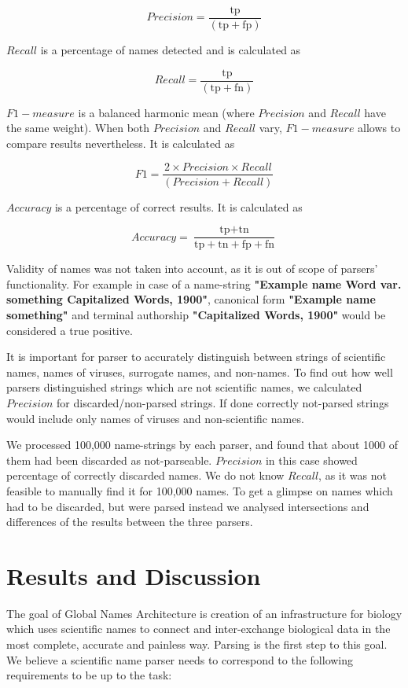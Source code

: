 \documentclass{bmcart}
\begin{document}
\[Precision = \dfrac{\text{tp}}{(\text{tp} + \text{fp})}\]

$Recall$ is a percentage of names detected and is calculated as

\[Recall = \dfrac{\text{tp}}{(\text{tp} + \text{fn})}\]

$F1-measure$ is a balanced harmonic mean (where $Precision$ and $Recall$ have
the same weight). When both $Precision$ and $Recall$ vary, $F1-measure$ allows
to compare results nevertheless. It is calculated as

\[F1 = \dfrac{2 \times Precision \times Recall}{(Precision + Recall)}\]

$Accuracy$ is a percentage of correct results. It is calculated as

\[Accuracy = \dfrac{\text{tp} + \text{tn}}
  {\text{tp} + \text{tn} + \text{fp} + \text{fn}}\]

Validity of names was not taken into account, as it is out of scope of
parsers' functionality. For example in case of a name-string \textbf{"Example
name Word var.  something Capitalized Words, 1900"}, canonical form
\textbf{"Example name something"} and terminal authorship \textbf{"Capitalized
Words, 1900"} would be considered a true positive.

It is important for parser to accurately distinguish between strings of
scientific names, names of viruses, surrogate names, and non-names. To find
out how well parsers distinguished strings which are not scientific names, we
calculated $Precision$ for discarded/non-parsed strings. If done correctly
not-parsed strings would include only names of viruses and non-scientific
names.

We processed 100,000 name-strings by each parser, and found that about 1000 of
them had been discarded as not-parseable. $Precision$ in this case showed
percentage of correctly discarded names.  We do not know $Recall$, as it was
not feasible to manually find it for 100,000 names. To get a glimpse on names
which had to be discarded, but were parsed instead we analysed intersections
and differences of the results between the three parsers.

\section*{Results and Discussion}

The goal of Global Names Architecture is creation of an infrastructure for
biology which uses scientific names to connect and inter-exchange biological
data in the most complete, accurate and painless way. Parsing is the first
step to this goal. We believe a scientific name parser needs to correspond to
the following requirements to be up to the task:
\end{document}
